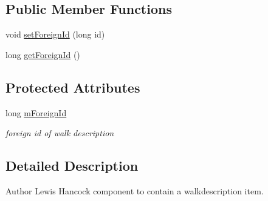 \subsection*{Public Member Functions}
\begin{DoxyCompactItemize}
\item 
void \hyperlink{classuk_1_1ac_1_1swan_1_1digitaltrails_1_1components_1_1_walk_description_a4d324df4e164db2cfa9c3c07912fd7b5}{set\+Foreign\+Id} (long id)
\item 
long \hyperlink{classuk_1_1ac_1_1swan_1_1digitaltrails_1_1components_1_1_walk_description_aaf82d4cb3c6580eac0c679009ce85510}{get\+Foreign\+Id} ()
\end{DoxyCompactItemize}
\subsection*{Protected Attributes}
\begin{DoxyCompactItemize}
\item 
long \hyperlink{classuk_1_1ac_1_1swan_1_1digitaltrails_1_1components_1_1_walk_description_ad6c63d9167c0f2a07c6a1f76cb4e5eb8}{m\+Foreign\+Id}
\begin{DoxyCompactList}\small\item\em foreign id of walk description \end{DoxyCompactList}\end{DoxyCompactItemize}


\subsection{Detailed Description}
\begin{DoxyAuthor}{Author}
Lewis Hancock component to contain a walkdescription item. 
\end{DoxyAuthor}


